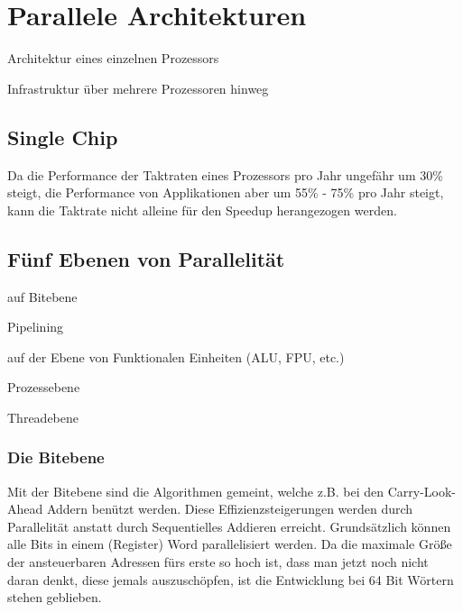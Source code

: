 \section{Parallele Architekturen}

\begin{compactitem}
\item Architektur eines einzelnen Prozessors
\item Infrastruktur über mehrere Prozessoren hinweg
\end{compactitem}

\subsection{Single Chip}

Da die Performance der Taktraten eines Prozessors pro Jahr ungefähr um 30\%
steigt, die Performance von Applikationen aber um 55\% - 75\% pro Jahr steigt,
kann die Taktrate nicht alleine für den Speedup herangezogen werden.

\subsection{Fünf Ebenen von Parallelität}

\begin{compactitem}
\item auf Bitebene
\item Pipelining
\item auf der Ebene von Funktionalen Einheiten (ALU, FPU, etc.)
\item Prozessebene
\item Threadebene
\end{compactitem}

\subsubsection{Die Bitebene}

Mit der Bitebene sind die Algorithmen gemeint, welche z.B. bei den Carry-Look-Ahead
Addern benützt werden. Diese Effizienzsteigerungen werden durch Parallelität anstatt
durch Sequentielles Addieren erreicht. Grundsätzlich können alle Bits in einem 
(Register) Word parallelisiert werden. Da die maximale Größe der ansteuerbaren
Adressen fürs erste so hoch ist, dass man jetzt noch nicht daran denkt, diese
jemals auszuschöpfen, ist die Entwicklung bei 64 Bit Wörtern stehen geblieben.
